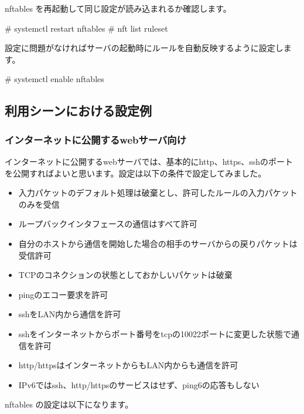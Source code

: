 \documentclass[mingoth,a4paper]{jsarticle}
\begin{document}
nftables を再起動して同じ設定が読み込まれるか確認します。

\begin{commandline}
# systemctl restart nftables
# nft list ruleset
\end{commandline}

設定に問題がなければサーバの起動時にルールを自動反映するように設定します。

\begin{commandline}
# systemctl enable nftables
\end{commandline}


\subsection{利用シーンにおける設定例}

\subsubsection{インターネットに公開するwebサーバ向け}

インターネットに公開するwebサーバでは、基本的にhttp、https、sshのポートを公開すればよいと思います。設定は以下の条件で設定してみました。

\begin{itemize}
\item 入力パケットのデフォルト処理は破棄とし、許可したルールの入力パケットのみを受信
\item ループバックインタフェースの通信はすべて許可
\item 自分のホストから通信を開始した場合の相手のサーバからの戻りパケットは受信許可
\item TCPのコネクションの状態としておかしいパケットは破棄
\item pingのエコー要求を許可
\item sshをLAN内から通信を許可
\item sshをインターネットからポート番号をtcpの10022ポートに変更した状態で通信を許可
\item http/httpsはインターネットからもLAN内からも通信を許可
\item IPv6ではssh、http/httpsのサービスはせず、ping6の応答もしない
\end{itemize}

nftables の設定は以下になります。
\end{document}
